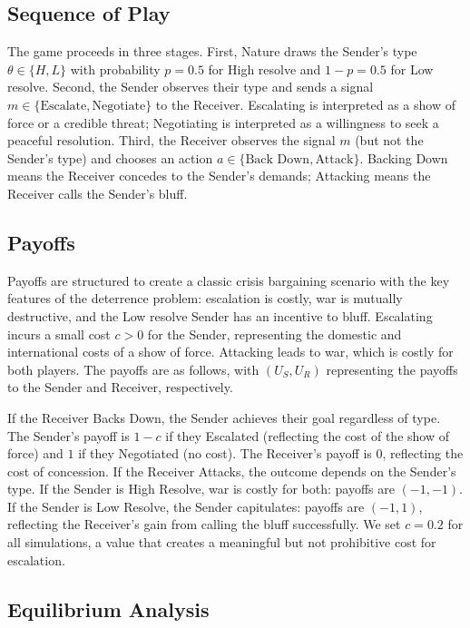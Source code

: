 \documentclass[12pt]{article}
\theoremstyle{plain}
\theoremstyle{definition}
\begin{document}
\subsection{Sequence of Play}

The game proceeds in three stages. First, Nature draws the Sender's type $\theta \in \{H, L\}$ with probability $p = 0.5$ for High resolve and $1-p = 0.5$ for Low resolve. Second, the Sender observes their type and sends a signal $m \in \{\text{Escalate}, \text{Negotiate}\}$ to the Receiver. Escalating is interpreted as a show of force or a credible threat; Negotiating is interpreted as a willingness to seek a peaceful resolution. Third, the Receiver observes the signal $m$ (but not the Sender's type) and chooses an action $a \in \{\text{Back Down}, \text{Attack}\}$. Backing Down means the Receiver concedes to the Sender's demands; Attacking means the Receiver calls the Sender's bluff.

\subsection{Payoffs}

Payoffs are structured to create a classic crisis bargaining scenario with the key features of the deterrence problem: escalation is costly, war is mutually destructive, and the Low resolve Sender has an incentive to bluff. Escalating incurs a small cost $c > 0$ for the Sender, representing the domestic and international costs of a show of force. Attacking leads to war, which is costly for both players. The payoffs are as follows, with $(U_S, U_R)$ representing the payoffs to the Sender and Receiver, respectively.

If the Receiver Backs Down, the Sender achieves their goal regardless of type. The Sender's payoff is $1 - c$ if they Escalated (reflecting the cost of the show of force) and $1$ if they Negotiated (no cost). The Receiver's payoff is $0$, reflecting the cost of concession. If the Receiver Attacks, the outcome depends on the Sender's type. If the Sender is High Resolve, war is costly for both: payoffs are $(-1, -1)$. If the Sender is Low Resolve, the Sender capitulates: payoffs are $(-1, 1)$, reflecting the Receiver's gain from calling the bluff successfully. We set $c = 0.2$ for all simulations, a value that creates a meaningful but not prohibitive cost for escalation.

\subsection{Equilibrium Analysis}
\end{document}
